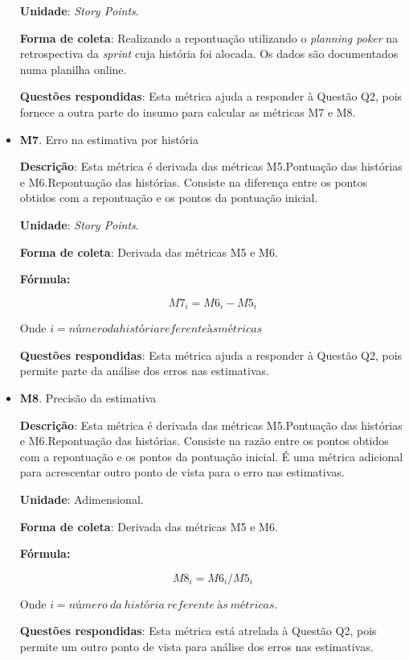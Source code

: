 \begin{itemize}
	   \subitem \textbf{Unidade}: \textit{Story Points}.

	   \subitem \textbf{Forma de coleta}: Realizando a repontuação utilizando o \textit{planning poker} na retrospectiva da \textit{sprint}
		    cuja história foi alocada. Os dados são documentados numa planilha online.

	   \subitem \textbf{Questões respondidas}: Esta métrica ajuda a responder à Questão Q2, pois fornece a outra parte do insumo para calcular
		    as métricas M7 e M8.

	 \item \textbf{M7}. Erro na estimativa por história

	   \subitem \textbf{Descrição}: Esta métrica é derivada das métricas M5.Pontuação das histórias e M6.Repontuação das histórias.
		    Consiste na diferença entre os pontos obtidos com a repontuação e os pontos da pontuação inicial.

	   \subitem \textbf{Unidade}: \textit{Story Points}.

	   \subitem \textbf{Forma de coleta}: Derivada das métricas M5 e M6.

	      \subsubitem \textbf{Fórmula:}

		$$ M7_i = M6_i - M5_i $$

	      \subsubitem Onde $i = número da história referente às métricas$

	   \subitem \textbf{Questões respondidas}: Esta métrica ajuda a responder à Questão Q2, pois permite parte da análise
		    dos erros nas estimativas.

	 \item \textbf{M8}. Precisão da estimativa

	   \subitem \textbf{Descrição}: Esta métrica é derivada das métricas M5.Pontuação das histórias e M6.Repontuação das histórias.
		    Consiste na razão entre os pontos obtidos com a repontuação e os pontos da pontuação inicial. É uma métrica adicional
		    para acrescentar outro ponto de vista para o erro nas estimativas.

	   \subitem \textbf{Unidade}: Adimensional.

	   \subitem \textbf{Forma de coleta}: Derivada das métricas M5 e M6.

	      \subsubitem \textbf{Fórmula:}

		$$ M8_i = M6_i / M5_i $$

	      \subsubitem Onde $i = número\ da\ história\ referente\ às\ métricas$.

	   \subitem \textbf{Questões respondidas}: Esta métrica está atrelada à Questão Q2, pois permite um outro ponto de vista
		    para análise dos erros nas estimativas.


\end{itemize}
